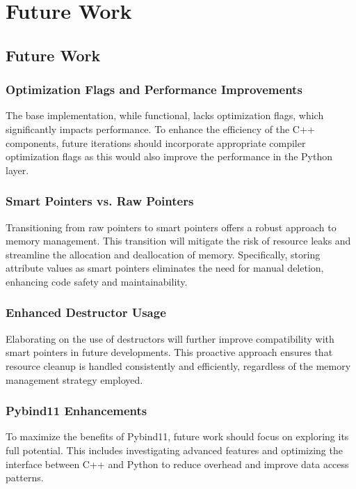 \chapter{Future Work}\label{chapter:fw_conc} 

\section{Future Work}

\subsection{Optimization Flags and Performance Improvements}

The base implementation, while functional, lacks optimization flags, which significantly impacts performance. To enhance the efficiency of the C++ components, future iterations should incorporate appropriate compiler optimization flags as this would also improve the performance in the Python layer.

\subsection{Smart Pointers vs. Raw Pointers}

Transitioning from raw pointers to smart pointers offers a robust approach to memory management. This transition will mitigate the risk of resource leaks and streamline the allocation and deallocation of memory. Specifically, storing attribute values as smart pointers eliminates the need for manual deletion, enhancing code safety and maintainability.

\subsection{Enhanced Destructor Usage}

Elaborating on the use of destructors will further improve compatibility with smart pointers in future developments. This proactive approach ensures that resource cleanup is handled consistently and efficiently, regardless of the memory management strategy employed.

\subsection{Pybind11 Enhancements}

To maximize the benefits of Pybind11, future work should focus on exploring its full potential. This includes investigating advanced features and optimizing the interface between C++ and Python to reduce overhead and improve data access patterns.

